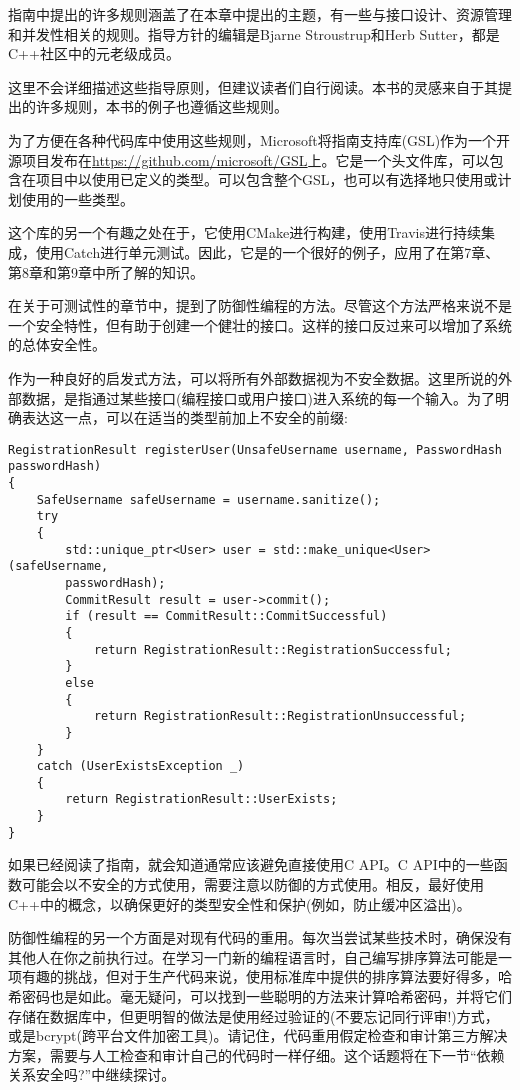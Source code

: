 指南中提出的许多规则涵盖了在本章中提出的主题，有一些与接口设计、资源管理和并发性相关的规则。指导方针的编辑是Bjarne Stroustrup和Herb Sutter，都是C++社区中的元老级成员。

这里不会详细描述这些指导原则，但建议读者们自行阅读。本书的灵感来自于其提出的许多规则，本书的例子也遵循这些规则。

为了方便在各种代码库中使用这些规则，Microsoft将指南支持库(GSL)作为一个开源项目发布在\url{https://github.com/microsoft/GSL}上。它是一个头文件库，可以包含在项目中以使用已定义的类型。可以包含整个GSL，也可以有选择地只使用或计划使用的一些类型。

这个库的另一个有趣之处在于，它使用CMake进行构建，使用Travis进行持续集成，使用Catch进行单元测试。因此，它是的一个很好的例子，应用了在第7章、第8章和第9章中所了解的知识。


在关于可测试性的章节中，提到了防御性编程的方法。尽管这个方法严格来说不是一个安全特性，但有助于创建一个健壮的接口。这样的接口反过来可以增加了系统的总体安全性。

作为一种良好的启发式方法，可以将所有外部数据视为不安全数据。这里所说的外部数据，是指通过某些接口(编程接口或用户接口)进入系统的每一个输入。为了明确表达这一点，可以在适当的类型前加上不安全的前缀:

\begin{lstlisting}[style=styleCXX]
RegistrationResult registerUser(UnsafeUsername username, PasswordHash
passwordHash)
{
	SafeUsername safeUsername = username.sanitize();
	try
	{
		std::unique_ptr<User> user = std::make_unique<User>(safeUsername,
		passwordHash);
		CommitResult result = user->commit();
		if (result == CommitResult::CommitSuccessful)
		{
			return RegistrationResult::RegistrationSuccessful;
		}
		else
		{
			return RegistrationResult::RegistrationUnsuccessful;
		}
	}
	catch (UserExistsException _)
	{
		return RegistrationResult::UserExists;
	}
}
\end{lstlisting}

如果已经阅读了指南，就会知道通常应该避免直接使用C API。C API中的一些函数可能会以不安全的方式使用，需要注意以防御的方式使用。相反，最好使用C++中的概念，以确保更好的类型安全性和保护(例如，防止缓冲区溢出)。

防御性编程的另一个方面是对现有代码的重用。每次当尝试某些技术时，确保没有其他人在你之前执行过。在学习一门新的编程语言时，自己编写排序算法可能是一项有趣的挑战，但对于生产代码来说，使用标准库中提供的排序算法要好得多，哈希密码也是如此。毫无疑问，可以找到一些聪明的方法来计算哈希密码，并将它们存储在数据库中，但更明智的做法是使用经过验证的(不要忘记同行评审!)方式，或是bcrypt(跨平台文件加密工具)。请记住，代码重用假定检查和审计第三方解决方案，需要与人工检查和审计自己的代码时一样仔细。这个话题将在下一节“依赖关系安全吗?”中继续探讨。


